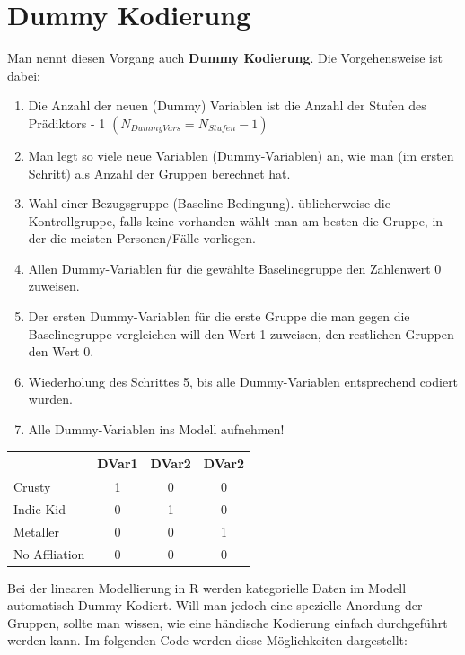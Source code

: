 \documentclass[]{article}
\providecommand{\tightlist}{%
  \setlength{\itemsep}{0pt}\setlength{\parskip}{0pt}}
\begin{document}
\hypertarget{dummy-kodierung}{%
\section*{Dummy Kodierung}\label{dummy-kodierung}}

Man nennt diesen Vorgang auch \textbf{Dummy Kodierung}. Die Vorgehensweise ist dabei:

\begin{enumerate}
\def\labelenumi{\arabic{enumi}.}
\tightlist
\item
  Die Anzahl der neuen (Dummy) Variablen ist die Anzahl der Stufen des Prädiktors - 1 \((N_{DummyVars} = N_{Stufen} - 1)\)
\item
  Man legt so viele neue Variablen (Dummy-Variablen) an, wie man (im ersten Schritt) als Anzahl der Gruppen berechnet hat.
\item
  Wahl einer Bezugsgruppe (Baseline-Bedingung). üblicherweise die Kontrollgruppe, falls keine vorhanden wählt man am besten die Gruppe, in der die meisten Personen/Fälle vorliegen.
\item
  Allen Dummy-Variablen für die gewählte Baselinegruppe den Zahlenwert 0 zuweisen.
\item
  Der ersten Dummy-Variablen für die erste Gruppe die man gegen die Baselinegruppe vergleichen will den Wert 1 zuweisen, den restlichen Gruppen den Wert 0.
\item
  Wiederholung des Schrittes 5, bis alle Dummy-Variablen entsprechend codiert wurden.
\item
  Alle Dummy-Variablen ins Modell aufnehmen!
\end{enumerate}

\begin{longtable}[]{@{}lccc@{}}
\toprule
& DVar1 & DVar2 & DVar2\tabularnewline
\midrule
\endhead
Crusty & 1 & 0 & 0\tabularnewline
Indie Kid & 0 & 1 & 0\tabularnewline
Metaller & 0 & 0 & 1\tabularnewline
No Affliation & 0 & 0 & 0\tabularnewline
\bottomrule
\end{longtable}

Bei der linearen Modellierung in R werden kategorielle Daten im Modell automatisch Dummy-Kodiert. Will man jedoch eine spezielle Anordung der Gruppen, sollte man wissen, wie eine händische Kodierung einfach durchgeführt werden kann. Im folgenden Code werden diese Möglichkeiten dargestellt:
\end{document}
